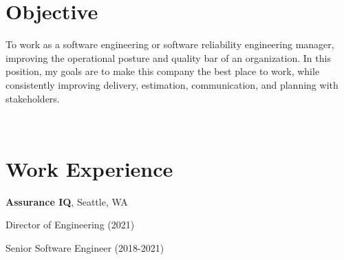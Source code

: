 \documentclass[letterpaper]{resume}
\begin{document}
\author{Christopher John Wallace}
\maketitle

\section{Objective}
\begin{compactitem}
\item
    To work as a software engineering or software reliability engineering
    manager, improving the operational posture and quality bar of an
    organization. In this position, my goals are to make this company the best
    place to work, while consistently improving delivery, estimation,
    communication, and planning with stakeholders.
\end{compactitem}

~

\section{Work Experience}

\textbf{Assurance IQ}, Seattle, WA

Director of Engineering (2021)

Senior Software Engineer (2018-2021)
\end{document}

